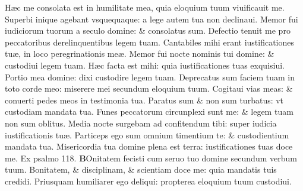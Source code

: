 \documentclass[a5paper,10pt]{book}
\def\ae{æ}
\begin{document}
\begin{multicols*}{2}
\newline \color{red} H\color{black}\ae c me consolata est in humilitate mea, quia eloquium tuum viuificauit me.
\newline \color{red} S\color{black}uperbi inique agebant vsquequaque: a lege autem tua non declinaui.
\newline \color{red} M\color{black}emor fui iudiciorum tuorum a seculo domine: \& consolatus sum.
\newline \color{red} D\color{black}efectio tenuit me pro peccatoribus derelinquentibus legem tuam.
\newline \color{red} C\color{black}antabiles mihi erant iustificationes tu\ae , in loco peregrinationis me\ae .
\newline \color{red} M\color{black}emor fui nocte nominis tui domine: \& custodiui legem tuam.
\newline \color{red} H\color{black}\ae c facta est mihi: quia iustificationes tuas exquisiui.
\newline \color{red} P\color{black}ortio mea domine: dixi custodire legem tuam.
\newline \color{red} D\color{black}eprecatus sum faciem tuam in toto corde meo: miserere mei secundum eloquium tuum.
\newline \color{red} C\color{black}ogitaui vias meas: \& conuerti pedes meos in testimonia tua.
\newline \color{red} P\color{black}aratus sum \& non sum turbatus: vt custodiam mandata tua.
\newline \color{red} F\color{black}unes peccatorum circunplexi sunt me: \& legem tuam non sum oblitus.
\newline \color{red} M\color{black}edia nocte surgebam ad confitendum tibi: super iudicia iustificationis tu\ae .
\newline \color{red} P\color{black}articeps ego sum omnium timentium te: \& custodientium mandata tua.
\newline \color{red} M\color{black}isericordia tua domine plena est terra: iustificationes tuas doce me. \quad \color{red} Ex psalmo \hypertarget{ps118.5}{118.} \color{black}
\vspace{-1em}
\lettrine[lines=2]{\bfseries \color{red} B}{}Onitatem fecisti cum seruo tuo domine secundum verbum tuum.
\newline \color{red} B\color{black}onitatem, \& disciplinam, \& scientiam doce me: quia mandatis tuis credidi.
\newline \color{red} P\color{black}riusquam humiliarer ego deliqui: propterea eloquium tuum custodiui.

\end{multicols*}
\end{document}
